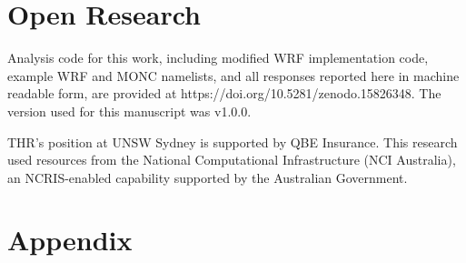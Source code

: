 \documentclass[draft]{agujournal2019}
\begin{document}
\section{Open Research}

Analysis code for this work, including modified WRF implementation code, example
WRF and MONC namelists, and all responses reported here in machine readable
form, are provided at https://doi.org/10.5281/zenodo.15826348. The version used
for this manuscript was v1.0.0.

\acknowledgments

THR's position at UNSW Sydney is supported by QBE Insurance. This research used
resources from the National Computational Infrastructure (NCI Australia), an
NCRIS-enabled capability supported by the Australian Government.



%



\newpage
\section*{Appendix}
\setcounter{figure}{0}
\renewcommand{\thefigure}{A\arabic{figure}}
\end{document}

